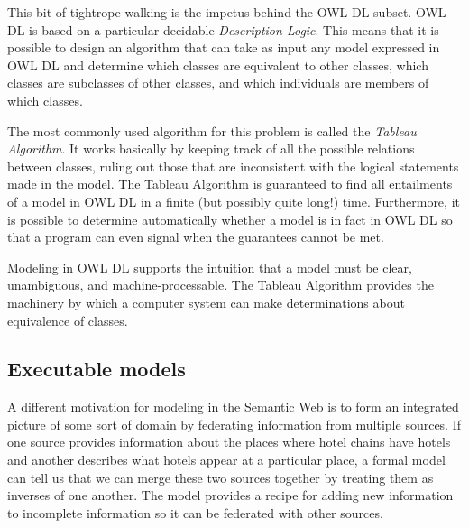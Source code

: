 This bit of tightrope walking is the impetus behind the OWL DL subset.
OWL DL is based on a particular decidable \emph{Description Logic}. This means
that it is possible to design an algorithm that can take as input any
model expressed in OWL DL and determine which classes are equivalent to
other classes, which classes are subclasses of other classes, and which
individuals are members of which classes.

The most commonly used algorithm for this problem is called the \emph{Tableau
Algorithm}. It works basically by keeping track of all the possible
relations between classes, ruling out those that are inconsistent with
the logical statements made in the model. The Tableau Algorithm is
guaranteed to find all entailments of a model in OWL DL in a finite (but
possibly quite long!) time. Furthermore, it is possible to determine
automatically whether a model is in fact in OWL DL so that a program can
even signal when the guarantees cannot be met.

Modeling in OWL DL supports the intuition that a model must be clear,
unambiguous, and machine-processable. The Tableau Algorithm provides the
machinery by which a computer system can make determinations about
equivalence of classes.

\subsection{Executable models}

A different motivation for modeling in the Semantic Web is to form an
integrated picture of some sort of domain by federating information from
multiple sources. If one source provides information about the places
where hotel chains have hotels and another describes what hotels appear
at a particular
place, a formal model can tell us that we can merge these two sources
together by treating them as inverses of one another. The model provides
a recipe for adding new information to incomplete information so it can
be federated with other sources.

